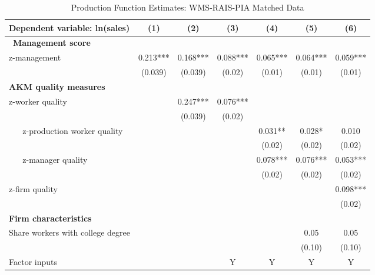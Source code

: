 
\begin{table}[h t]
  \caption{Production Function Estimates: WMS-RAIS-PIA Matched Data} \label{tab:e1_prodfcn}
  \begin{center}
\begin{tabular}{lcccccc}
    \toprule
\textbf{Dependent variable: ln(sales)}                                  	& (1)      & (2)       & (3)       & (4)     & (5) & (6)  \\
    \midrule\
\textbf{Management score} \\
z-management                  &0.213*** & 0.168*** & 0.088*** & 0.065***& 0.064***& 0.059***  	\\
                                  	&(0.039) 	& (0.039) 	& (0.02)   	& (0.01)    & (0.01)    & (0.01)    		\\
\textbf{AKM quality measures} \\
z-worker quality           &	  	& 0.247***	& 0.076*** &           	&           	&           		\\
                                  	&	  	& (0.039)   	& (0.02)     &           	&          	& 			\\
~ ~ z-production worker quality   &       	&          	& 		& 0.031**  & 0.028*   & 0.010     	\\
                                  	&	 	&          	& 		& (0.02)    & (0.02)    & (0.02)    		\\
~ ~ z-manager quality       &       	&          	& 		& 0.078*** & 0.076***& 0.053***  	\\
                                  	& 		& 		&          	& (0.02)    	& (0.02)    	& (0.02)    \\
z-firm quality               	&          	&           	&           	&		&		& 0.098***  \\
                                  	&          	&           	&           	& 		&		& (0.02)    \\	
\textbf{Firm characteristics} \\
Share workers with college degree & &           	& 		& 		& 0.05      	& 0.05      \\
                                  	& 		&          	& 		& 		& (0.10)    & (0.10)    \\
\midrule
Factor inputs	 		& 		& 	 	& Y 		& 	Y 	& 	Y	& Y \\

\end{tabular}
\end{center}
\end{table}
